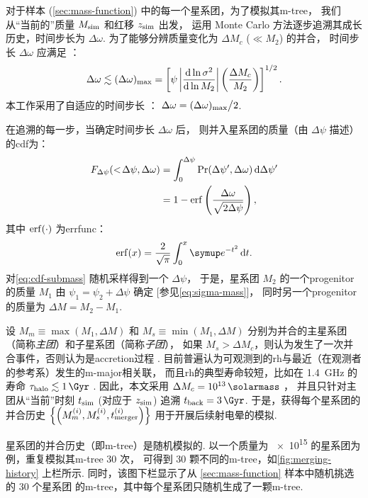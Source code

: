 对于样本 (\autoref{sec:mass-function}) 中的每一个星系团，为了模拟其\ac{m-tree}，
我们从\enquote{当前的}质量 $M_{\mathrm{sim}}$ 和红移 $z_{\mathrm{sim}}$ 出发，
运用 Monte Carlo 方法逐步追溯其成长历史，时间步长为 $\Delta\omega$.
为了能够分辨质量变化为 $\Delta M_c$ ($\ll M_2$) 的并合，
时间步长 $\Delta\omega$ 应满足 \cite{lacey1993}：
\begin{equation}
  \Delta\omega \lesssim (\Delta\omega)_{\mathrm{max}} =
    \left[ \psi \left| \frac{\mathrm{d}\ln \sigma^2}{\mathrm{d}\ln M_2} \right|
      \left( \frac{\Delta M_c}{M_2} \right) \right]^{1/2} .
\end{equation}
本工作采用了自适应的时间步长 \cite{randall2002}：
$\Delta\omega = (\Delta\omega)_{\mathrm{max}} \big/ 2$.

在追溯的每一步，当确定时间步长 $\Delta\omega$ 后，
则并入星系团的质量（由 $\Delta\psi$ 描述）的\ac{cdf}为：
\begin{align}
  F_{\Delta\psi}(<\!\Delta\psi, \Delta\omega)
    & = \int_0^{\Delta\psi} \mathrm{Pr}(\Delta\psi', \Delta\omega)
      \,\mathrm{d}\Delta\psi' \\
    & = 1 - \operatorname{erf} \left( \frac{\Delta\omega}{\sqrt{2\Delta\psi}} \right) ,
  \label{eq:cdf-submass}
\end{align}
其中 $\operatorname{erf}(\cdot)$ 为\ac{errfunc}：
\begin{equation}
  \erf(x) = \frac{2}{\sqrt{\pi}} \int_0^x \Ce^{-t^2} \,\D{t} .
\end{equation}
对\autoref{eq:cdf-submass} 随机采样得到一个 $\Delta\psi$，
于是，星系团 $M_2$ 的一个\ac{progenitor}的质量 $M_1$
由 $\psi_1 = \psi_2 + \Delta\psi$ 确定 [参见\autoref{eq:sigma-mass}]，
同时另一个\ac{progenitor}的质量为 $\Delta M = M_2 - M_1$.

设 $M_m \equiv \max(M_1, \Delta M)$ 和 $M_s \equiv \min(M_1, \Delta M)$
分别为并合的主星系团（简称\emph{主团}）和子星系团（简称\emph{子团}），
如果 $M_s > \Delta M_c$，则认为发生了一次并合事件，否则认为是\ac{accretion}过程
\cite{randall2002}.
目前普遍认为可观测到的\ac{rh}与最近（在观测者的参考系）发生的\ac{m-major}相关联，
而且\ac{rh}的典型寿命较短，比如在 \SI{1.4}{\GHz} 的寿命
$\tau_{\R{halo}} \lesssim \SI{1}{\Gyr}$ \cite{brunetti2009,cassano2016}.
因此，本文采用 $\Delta M_c = \SI{e13}{\solarmass}$ \cite{cassano2005}，
并且只针对主团从\enquote{当前}时刻 $t_{\mathrm{sim}}$ (对应于 $z_{\mathrm{sim}}$)
追溯 $t_{\R{back}} = \SI{3}{\Gyr}$.
于是，获得每个星系团的并合历史
$\left\{\left( M_m^{(i)}, M_s^{(i)}, t_{\mathrm{merger}}^{(i)} \right)\right\}$
用于开展后续射电晕的模拟.

星系团的并合历史（即\ac{m-tree}）是随机模拟的.
以一个质量为 \SI{e15}{\solarmass} 的星系团为例，重复模拟其\ac{m-tree} 30 次，
可得到 30 颗不同的\ac{m-tree}，如\autoref{fig:merging-history} 上栏所示.
同时，该图下栏显示了从 \autoref{sec:mass-function} 样本中随机挑选的 30 个星系团
的\ac{m-tree}，其中每个星系团只随机生成了一颗\ac{m-tree}.

